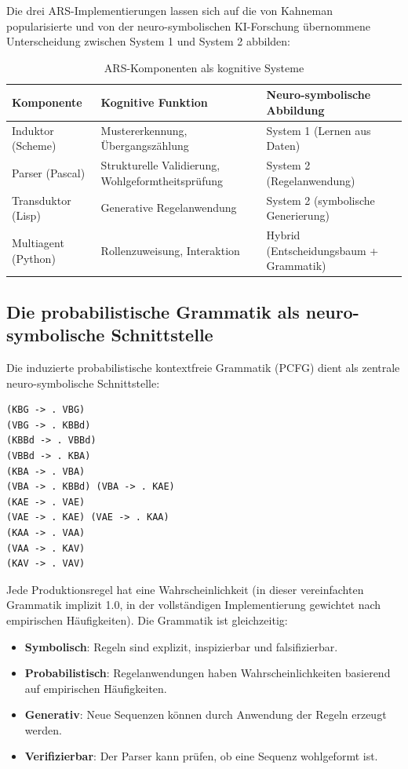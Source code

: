 \documentclass[12pt,a4paper]{article}
\begin{document}
Die drei ARS-Implementierungen lassen sich auf die von Kahneman 
\citep{kahneman2011thinking} popularisierte und von der neuro-symbolischen 
KI-Forschung übernommene Unterscheidung zwischen System 1 und System 2 
\citep{marcus2020next} abbilden:

\begin{table}[H]
\centering
\caption{ARS-Komponenten als kognitive Systeme}
\label{tab:cognitive}
\begin{tabular}{@{} p{3cm} p{4cm} p{6cm} @{}}
\toprule
\textbf{Komponente} & \textbf{Kognitive Funktion} & \textbf{Neuro-symbolische Abbildung} \\
\midrule
Induktor (Scheme) & Mustererkennung, Übergangszählung & System 1 (Lernen aus Daten) \\
Parser (Pascal) & Strukturelle Validierung, Wohlgeformtheitsprüfung & System 2 (Regelanwendung) \\
Transduktor (Lisp) & Generative Regelanwendung & System 2 (symbolische Generierung) \\
Multiagent (Python) & Rollenzuweisung, Interaktion & Hybrid (Entscheidungsbaum + Grammatik) \\
\bottomrule
\end{tabular}
\end{table}

\subsection{Die probabilistische Grammatik als neuro-symbolische Schnittstelle}

Die induzierte probabilistische kontextfreie Grammatik (PCFG) dient als zentrale 
neuro-symbolische Schnittstelle:

\begin{verbatim}
(KBG -> . VBG)
(VBG -> . KBBd)
(KBBd -> . VBBd)
(VBBd -> . KBA)
(KBA -> . VBA)
(VBA -> . KBBd) (VBA -> . KAE)
(KAE -> . VAE)
(VAE -> . KAE) (VAE -> . KAA)
(KAA -> . VAA)
(VAA -> . KAV)
(KAV -> . VAV)
\end{verbatim}

Jede Produktionsregel hat eine Wahrscheinlichkeit (in dieser vereinfachten 
Grammatik implizit 1.0, in der vollständigen Implementierung gewichtet nach 
empirischen Häufigkeiten). Die Grammatik ist gleichzeitig:

\begin{itemize}
    \item \textbf{Symbolisch}: Regeln sind explizit, inspizierbar und 
    falsifizierbar.
    \item \textbf{Probabilistisch}: Regelanwendungen haben Wahrscheinlichkeiten 
    basierend auf empirischen Häufigkeiten.
    \item \textbf{Generativ}: Neue Sequenzen können durch Anwendung der Regeln 
    erzeugt werden.
    \item \textbf{Verifizierbar}: Der Parser kann prüfen, ob eine Sequenz 
    wohlgeformt ist.
\end{itemize}
\end{document}
